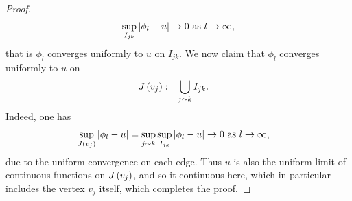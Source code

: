 \begin{proof}
	\begin{align*}
		\sup_{I_{jk}}\left\lvert \phi_l - u \right\rvert\rightarrow0 \ \text{as} \ l \rightarrow\infty,
	\end{align*}
	that is $\phi_l$ converges uniformly to $u$ on $I_{jk}$.
	We now claim that $\phi_l$ converges uniformly to $u$ on
	\begin{align*}
		J\left( v_j \right) &:= \bigcup_{j\sim k}I_{jk}.
	\end{align*}
	Indeed, one has 
	\begin{align*}
		\sup_{J\left( v_j \right)}\left\lvert \phi_l - u \right\rvert 
		&= \sup_{j\sim k}\sup_{I_{jk}}\left\lvert \phi_l - u \right\rvert
		\rightarrow0 \ \text{as} \ l \rightarrow\infty,
	\end{align*}
	due to the uniform convergence on each edge.
	Thus $u$ is also the uniform limit of continuous functions on $J\left( v_j \right)$, and so it continuous here, which in particular includes the vertex $v_j$ itself, which completes the proof.
\end{proof}